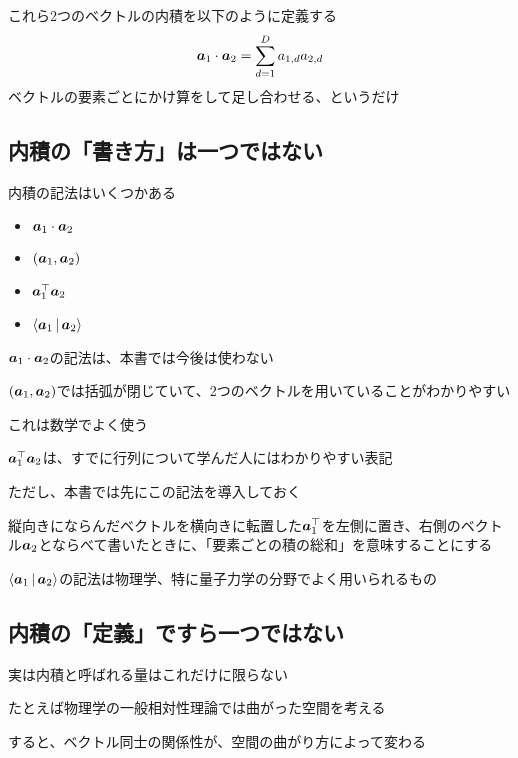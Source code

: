 \documentclass[../book_half_step_linear]{subfiles}
\begin{document}
\br

これら2つのベクトルの内積を以下のように定義する
\begin{equation*}
  \vb*{a}_1 \cdot \vb*{a}_2 = \sum_{d=1}^{D} a_{1,d} a_{2,d}
\end{equation*}
ベクトルの要素ごとにかけ算をして足し合わせる、というだけ

\sectionline
\subsection{内積の「書き方」は一つではない}

内積の記法はいくつかある
\begin{itemize}
  \item $\vb*{a}_1 \cdot \vb*{a}_2$
  \item $\left( \vb*{a}_1, \vb*{a}_2 \right)$
  \item $\vb*{a}_1^\top \vb*{a}_2$
  \item $\Braket{\vb*{a}_1|\vb*{a}_2}$
\end{itemize}

$\vb*{a}_1 \cdot \vb*{a}_2$の記法は、本書では今後は使わない

\br

$\left( \vb*{a}_1, \vb*{a}_2 \right)$では括弧が閉じていて、2つのベクトルを用いていることがわかりやすい

これは数学でよく使う

\br

$\vb*{a}_1^\top \vb*{a}_2$は、すでに行列について学んだ人にはわかりやすい表記

ただし、本書では先にこの記法を導入しておく

縦向きにならんだベクトルを横向きに転置した$\vb*{a}_1^\top$を左側に置き、右側のベクトル$\vb*{a}_2$とならべて書いたときに、「要素ごとの積の総和」を意味することにする

\br

$\Braket{\vb*{a}_1|\vb*{a}_2}$の記法は物理学、特に量子力学の分野でよく用いられるもの

\sectionline
\subsection{内積の「定義」ですら一つではない}

実は内積と呼ばれる量はこれだけに限らない

たとえば物理学の一般相対性理論では曲がった空間を考える

すると、ベクトル同士の関係性が、空間の曲がり方によって変わる
\end{document}
